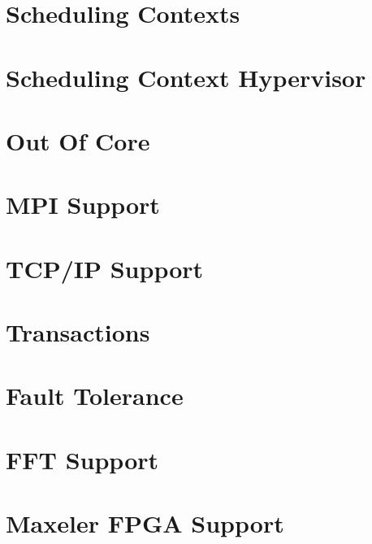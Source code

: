 \chapter{Scheduling Contexts}
\label{SchedulingContexts}
\hypertarget{SchedulingContexts}{}


\chapter{Scheduling Context Hypervisor}
\label{SchedulingContextHypervisor}
\hypertarget{SchedulingContextHypervisor}{}


\chapter{Out Of Core}
\label{OutOfCore}
\hypertarget{OutOfCore}{}


\chapter{MPI Support}
\label{MPISupport}
\hypertarget{MPISupport}{}


\chapter{TCP/IP Support}
\label{TCPIPSupport}
\hypertarget{TCPIPSupport}{}


\chapter{Transactions}
\label{Transactions}
\hypertarget{Transactions}{}


\chapter{Fault Tolerance}
\label{FaultTolerance}
\hypertarget{FaultTolerance}{}


\chapter{FFT Support}
\label{FFTSupport}
\hypertarget{FFTSupport}{}


\chapter{Maxeler FPGA Support}
\label{MaxFPGASupport}
\hypertarget{MaxFPGASupport}{}


